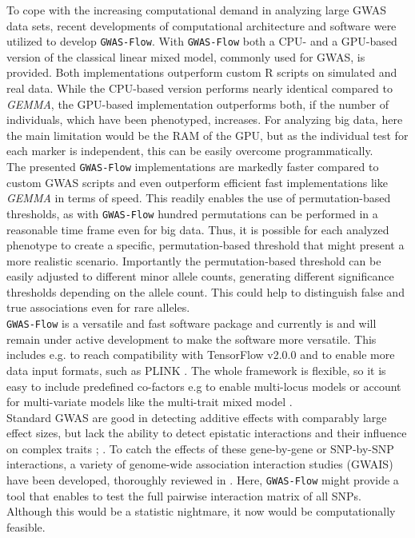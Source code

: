 To cope with the increasing computational demand in analyzing large GWAS data sets, recent
developments of computational architecture and software were utilized to develop
\texttt{GWAS-Flow}. With \texttt{GWAS-Flow} both a CPU- and a GPU-based version of the
classical linear mixed model, commonly used for GWAS, is provided. Both implementations
outperform custom R scripts on simulated and real data. While the CPU-based version
performs nearly identical compared to \textit{GEMMA}, the GPU-based implementation
outperforms both, if the number of individuals, which have been phenotyped, increases. For
analyzing big data, here the main limitation would be the RAM of the GPU, but as the
individual test for each marker is
independent, this can be easily overcome programmatically. \\
The presented \texttt{GWAS-Flow} implementations are markedly faster compared to custom
GWAS scripts and even outperform efficient fast implementations like \textit{GEMMA} in
terms of speed. This readily enables the use of permutation-based thresholds, as with
\texttt{GWAS-Flow} hundred permutations can be performed in a reasonable time frame even
for big data. Thus, it is possible for each analyzed phenotype to create a specific,
permutation-based threshold that might present a more realistic scenario. Importantly the
permutation-based threshold can be easily adjusted to different minor allele counts,
generating different significance thresholds depending on the allele count. This could
help to distinguish false and true associations even for rare alleles.\\
\texttt{GWAS-Flow} is a versatile and fast software package and currently is and will
remain under active development to make the software more versatile. This includes e.g. to
reach compatibility with TensorFlow v2.0.0 and to enable more data input formats, such as
PLINK \cite{purcell2007plink}. The whole framework is flexible, so it is easy to include
predefined co-factors e.g to enable multi-locus models \cite{segura2012efficient} or
account for multi-variate models like the multi-trait mixed model
\cite{korte2012mixed}. \\
Standard GWAS are good in detecting additive effects with comparably large effect sizes,
but lack the ability to detect epistatic interactions and their influence on complex
traits \cite{mckinney2012six}; \cite{korte2013advantages}. To catch the effects of these
gene-by-gene or SNP-by-SNP interactions, a variety of genome-wide association interaction
studies (GWAIS) have been developed, thoroughly reviewed in \cite{ritchie2018GWAIS}. Here,
\texttt{GWAS-Flow} might provide a tool that enables to test the full pairwise interaction
matrix of all SNPs. Although this would be a statistic nightmare, it now would be
computationally feasible.


